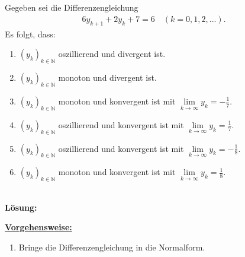 \subsection*{}
Gegeben sei die Differenzengleichung
\begin{align*}
	6y_{k+1} + 2 y_k +7 = 6
	\quad (k = 0,1,2,...).
\end{align*}
Es folgt, dass:
\renewcommand{\labelenumi}{(\alph{enumi})}
\begin{enumerate}
	\item
	$ (y_k)_{k \in \mathbb{N}} $ oszillierend und divergent ist.
	\item
	$ (y_k)_{k \in \mathbb{N}} $ monoton und divergent ist.	
	\item 
	$ (y_k)_{k \in \mathbb{N}} $ monoton und konvergent ist mit $ \lim \limits_{k \to \infty} y_k = -\frac{1}{7} $.
	\item
	$ (y_k)_{k \in \mathbb{N}} $ oszillierend und konvergent ist mit $ \lim \limits_{k \to \infty} y_k = \frac{1}{7} $.
	\item 
	$ (y_k)_{k \in \mathbb{N}} $ oszillierend und konvergent ist mit $ \lim \limits_{k \to \infty} y_k = -\frac{1}{8} $.
	\item 
	$ (y_k)_{k \in \mathbb{N}} $ monoton und konvergent ist mit $ \lim \limits_{k \to \infty} y_k = \frac{1}{8} $.
\end{enumerate}
\ \\
\textbf{Lösung:}
\begin{mdframed}
\underline{\textbf{Vorgehensweise:}}
\renewcommand{\labelenumi}{\theenumi.}
\begin{enumerate}
\item Bringe die Differenzengleichung in die Normalform.
\end{enumerate}
\end{mdframed}

